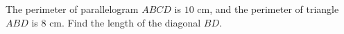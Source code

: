 The perimeter of parallelogram $ABCD$ is $10$ cm, and the perimeter of triangle $ABD$ is $8$ cm. Find the length of the diagonal $BD$.
